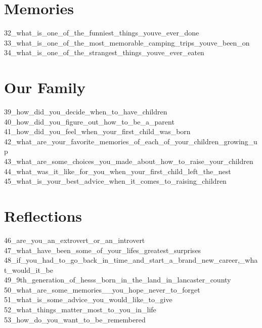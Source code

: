 \documentclass[smalldemyvopaper,11pt,twoside,onecolumn,openright,extrafontsizes]{memoir}
\begin{document}
\chapter{Memories}
{32_what_is_one_of_the_funniest_things_youve_ever_done}
{33_what_is_one_of_the_most_memorable_camping_trips_youve_been_on}
{34_what_is_one_of_the_strangest_things_youve_ever_eaten}
\chapter{Our Family}
{39_how_did_you_decide_when_to_have_children}
{40_how_did_you_figure_out_how_to_be_a_parent}
{41_how_did_you_feel_when_your_first_child_was_born}
{42_what_are_your_favorite_memories_of_each_of_your_children_growing_up}
{43_what_are_some_choices_you_made_about_how_to_raise_your_children}
{44_what_was_it_like_for_you_when_your_first_child_left_the_nest}
{45_what_is_your_best_advice_when_it_comes_to_raising_children}
\chapter{Reflections}
{46_are_you_an_extrovert_or_an_introvert}
{47_what_have_been_some_of_your_lifes_greatest_surprises}
{48_if_you_had_to_go_back_in_time_and_start_a_brand_new_career,_what_would_it_be}
{49_9th_generation_of_hesss_born_in_the_land_in_lancaster_county}
{50_what_are_some_memories__you_hope_never_to_forget}
{51_what_is_some_advice_you_would_like_to_give}
{52_what_things_matter_most_to_you_in_life}
{53_how_do_you_want_to_be_remembered}


\end{document}
